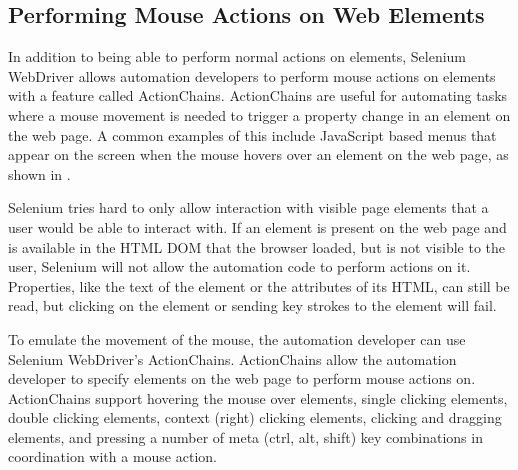 \subsection{Performing Mouse Actions on Web Elements}
\label{ssec:external_libs_selenium_mouse_actions}

In addition to being able to perform normal actions on elements, Selenium
WebDriver allows automation developers to perform mouse actions on elements
with a feature called ActionChains. ActionChains are useful for automating
tasks where a mouse movement is needed to trigger a property change in an
element on the web page. A common examples of this include JavaScript based
menus that appear on the screen when the mouse hovers over an element on the
web page, as shown in .

Selenium tries hard to only allow interaction with visible page elements that a
user would be able to interact with. If an element is present on the web page
and is available in the HTML DOM that the browser loaded, but is not visible to
the user, Selenium will not allow the automation code to perform actions on it.
Properties, like the text of the element or the attributes of its HTML, can
still be read, but clicking on the element or sending key strokes to the
element will fail.

To emulate the movement of the mouse, the automation developer can use Selenium
WebDriver's ActionChains.  ActionChains allow the automation developer to
specify elements on the web page to perform mouse actions on. ActionChains
support hovering the mouse over elements, single clicking elements, double
clicking elements, context (right) clicking elements, clicking and dragging
elements, and pressing a number of meta (ctrl, alt, shift) key combinations in
coordination with a mouse action.

